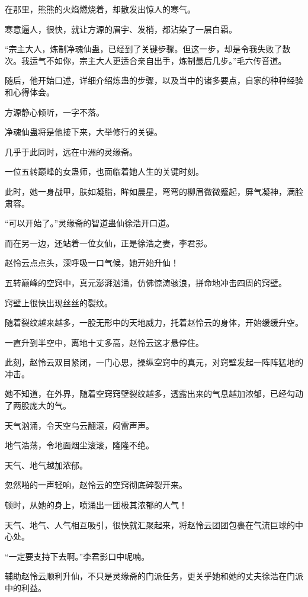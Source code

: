 \begin{this_body}
在那里，熊熊的火焰燃烧着，却散发出惊人的寒气。

寒意逼人，很快，就让方源的眉宇、发梢，都沾染了一层白霜。

“宗主大人，炼制净魂仙蛊，已经到了关键步骤。但这一步，却是令我失败了数次。我运气不如你，宗主大人更适合亲自出手，炼制最后几步。”毛六传音道。

随后，他开始口述，详细介绍炼蛊的步骤，以及当中的诸多要点，自家的种种经验和心得体会。

方源静心倾听，一字不落。

净魂仙蛊将是他接下来，大举修行的关键。

几乎于此同时，远在中洲的灵缘斋。

一位五转巅峰的女蛊师，也面临着她人生的关键时刻。

此时，她一身战甲，肤如凝脂，眸如晨星，弯弯的柳眉微微蹙起，屏气凝神，满脸肃容。

“可以开始了。”灵缘斋的智道蛊仙徐浩开口道。

而在另一边，还站着一位女仙，正是徐浩之妻，李君影。

赵怜云点点头，深呼吸一口气候，她开始升仙！

五转巅峰的空窍中，真元澎湃汹涌，仿佛惊涛骇浪，拼命地冲击四周的窍壁。

窍壁上很快出现丝丝的裂纹。

随着裂纹越来越多，一股无形中的天地威力，托着赵怜云的身体，开始缓缓升空。

一直升到半空中，离地十丈多高，赵怜云这才悬停住。

此刻，赵怜云双目紧闭，一门心思，操纵空窍中的真元，对窍壁发起一阵阵猛地的冲击。

她不知道，在外界，随着空窍窍壁裂纹越多，透露出来的气息越加浓郁，已经勾动了两股庞大的气。

天气汹涌，令天空乌云翻滚，闷雷声声。

地气浩荡，令地面烟尘滚滚，隆隆不绝。

天气、地气越加浓郁。

忽然啪的一声轻响，赵怜云的空窍彻底碎裂开来。

顿时，从她的身上，喷涌出一团极其浓郁的人气！

天气、地气、人气相互吸引，很快就汇聚起来，将赵怜云团团包裹在气流巨球的中心处。

“一定要支持下去啊。”李君影口中呢喃。

辅助赵怜云顺利升仙，不只是灵缘斋的门派任务，更关乎她和她的丈夫徐浩在门派中的利益。


\end{this_body}
